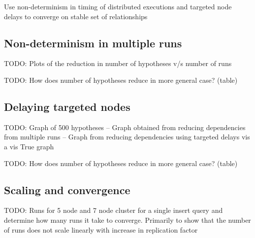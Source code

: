 Use non-determinism in timing of distributed executions and targeted node delays to converge on stable set of relationships

\subsection{Non-determinism in multiple runs}
TODO: Plots of the reduction in number of hypotheses v/s number of runs

TODO: How does number of hypotheses reduce in more general case? (table)

\subsection{Delaying targeted nodes}
TODO: Graph of 500 hypotheses -- Graph obtained from reducing dependencies from multiple runs -- Graph from reducing dependencies using targeted delays vis a vis True graph

TODO: How does number of hypotheses reduce in more general case? (table)

\subsection{Scaling and convergence}
TODO: Runs for 5 node and 7 node cluster for a single insert query and determine how many runs it take to converge. Primarily to show that the number of runs does not scale linearly with increase in replication factor

